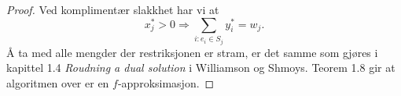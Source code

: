 \documentclass[12pt]{article}
\begin{document}
\begin{proof}
Ved komplimentær slakkhet har vi at
\begin{equation*}
x_j^* > 0 \Rightarrow \sum_{i:e_i \in S_j} y_i^* = w_j.
\end{equation*}
Å ta med alle mengder der restriksjonen er stram, er det samme som gjøres i kapittel 1.4 \textit{Roudning a dual solution} i Williamson og Shmoys. Teorem 1.8 gir at algoritmen over er en $f$-approksimasjon.
\end{proof}
\end{document}
